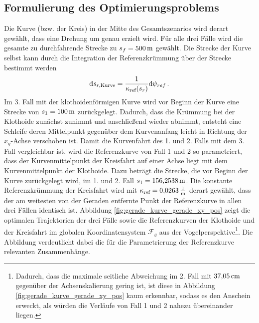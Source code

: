 \subsection{Formulierung des Optimierungsproblems}
Die Kurve (bzw. der Kreis) in der Mitte des Gesamtszenarios wird derart gewählt, dass eine Drehung um genau  erzielt wird. Für alle drei Fälle wird die gesamte zu durchfahrende Strecke zu $s_f = 500\,\mathrm{m}$ gewählt. Die Strecke der Kurve selbst kann durch die Integration der Referenzkrümmung über der Strecke bestimmt werden
\begin{equation}
	\textrm{d}{s_{r,\textrm{Kurve}}} = \frac{1}{\kappa_{\textrm{ref}}(s_r)}\textrm{d}{\psi_{ref}} \,. \label{eq:Kurvenstrecke}
\end{equation}
Im 3. Fall mit der klothoidenförmigen Kurve wird vor Beginn der Kurve eine Strecke von $s_1 = 100\,\mathrm{m}$ zurückgelegt. Dadurch, dass die Krümmung bei der Klothoide zunächst zunimmt und anschließend wieder abnimmt, entsteht eine Schleife deren Mittelpunkt gegenüber dem Kurvenanfang leicht in Richtung der $x_g$-Achse verschoben ist. Damit die Kurvenfahrt des 1. und 2. Falls mit dem 3. Fall vergleichbar ist, wird die Referenzkurve von Fall 1 und 2 so parametriert, dass der Kurvenmittelpunkt der Kreisfahrt auf einer Achse liegt mit dem Kurvenmittelpunkt der Klothoide. Dazu beträgt die Strecke, die vor Beginn der Kurve zurückgelegt wird, im 1. und 2. Fall $s_1 = 156{,}2538\,\mathrm{m}$. Die konstante Referenzkrümmung der Kreisfahrt wird mit $\kappa_{\textrm{ref}} = 0{,}0263\,\mathrm{\frac{\mathrm{1}}{\mathrm{m}}}$ derart gewählt, dass der am weitesten von der Geraden entfernte Punkt der Referenzkurve in allen drei Fällen identisch ist. Abbildung \ref{fig:gerade_kurve_gerade_xy_pos} zeigt die optimalen Trajektorien der drei Fälle sowie die Referenzkurven der Klothoide und der Kreisfahrt im globalen Koordinatensystem $\mathcal{F}_g$ aus der Vogelperspektive\footnote{Dadurch, dass die maximale seitliche Abweichung im 2. Fall mit $37{,}05\,\mathrm{cm}$ gegenüber der Achsenskalierung gering ist, ist diese in Abbildung \ref{fig:gerade_kurve_gerade_xy_pos} kaum erkennbar, sodass es den Anschein erweckt, als würden die Verläufe von Fall 1 und 2 nahezu übereinander liegen.}. Die Abbildung verdeutlicht dabei die für die Parametrierung der Referenzkurve relevanten Zusammenhänge. 
